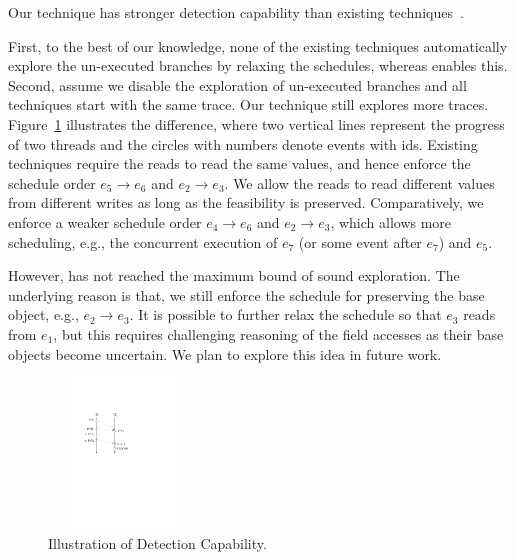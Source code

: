 \begin{mydiscussion}
Our technique has stronger detection capability than existing techniques~\cite{yannis,pldi14,Said:2011}.
\end{mydiscussion}

First, to the best of our knowledge, none of the existing techniques 
automatically explore the un-executed branches by relaxing the schedules, whereas \tool enables this.
Second, assume we disable the exploration of un-executed branches and all 
techniques start with the same trace. Our technique still explores more 
traces. Figure~\ref{fig:discuss} illustrates the difference, where two 
vertical lines represent the progress of two threads and the circles 
with numbers denote events with ids. 
Existing techniques require the reads to read the same values, and hence
enforce the schedule order $e_5 \rightarrow e_6$ and $e_2\rightarrow e_3$. 
We allow the reads to read different values from different writes as long as 
the feasibility is preserved. Comparatively, we enforce a weaker 
schedule order  $e_4 \rightarrow e_6$ and $e_2\rightarrow e_3$, which 
allows more scheduling, e.g., the concurrent execution of $e_7$ (or 
some event after $e_7$) and $e_5$.

However, \tool has not reached the maximum bound of sound exploration.
The underlying reason is that, we still enforce the schedule for 
preserving the base object, e.g., $e_2\rightarrow e_3$. It is possible 
to further relax the schedule so that $e_3$ reads from $e_1$, but 
this requires challenging reasoning of the field accesses as their base 
objects become uncertain. We plan to explore this idea in future work.




\begin{figure}[htp]
\centering
\includegraphics[width=4cm,height=4cm]{figs/Visio-discuss.pdf}
\caption{Illustration of Detection Capability.}\label{fig:discuss}
\end{figure}




